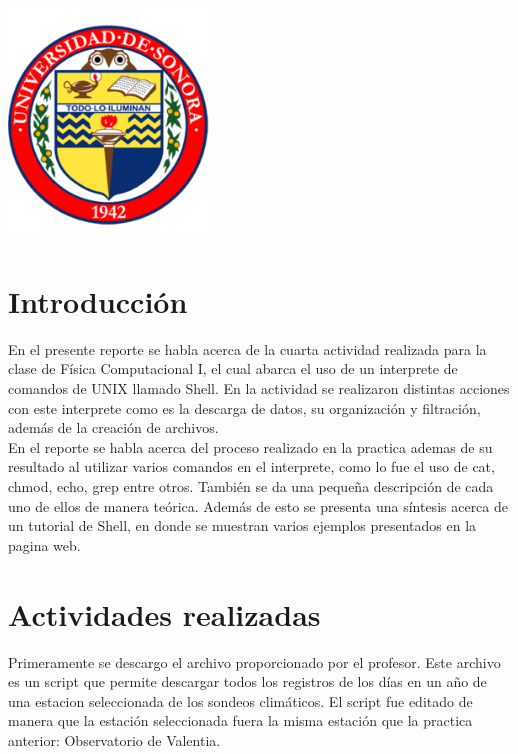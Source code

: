 \documentclass[12pt]{article}
\begin{document}
\begin{titlepage}
\includegraphics[width=0.4\textwidth]{logo.png}\\
 

\vfill %

\end{titlepage}

\section{Introducción}
En el presente reporte se habla acerca de la cuarta actividad realizada para la clase de Física Computacional I, el cual abarca el uso de un interprete de comandos de UNIX llamado Shell. En la actividad se realizaron distintas acciones con este interprete como es la descarga de datos, su organización y filtración, además de la creación de archivos.\\ 

En el reporte se habla acerca del proceso realizado en la practica ademas de su resultado al utilizar varios comandos en el interprete, como lo fue el uso de  cat, chmod, echo, grep entre otros. También se da una pequeña descripción de cada uno de ellos de manera teórica. Además de esto se presenta una síntesis acerca de un tutorial de Shell, en donde se muestran varios ejemplos presentados en la pagina web. 

\section{Actividades realizadas}
Primeramente se descargo el archivo proporcionado por el profesor. Este archivo es un script que permite descargar todos los registros de los días en un año de una estacion seleccionada de los sondeos climáticos. El script fue editado de manera que la estación seleccionada fuera la misma estación que la practica anterior: Observatorio de Valentia. \\ \\
\end{document}

